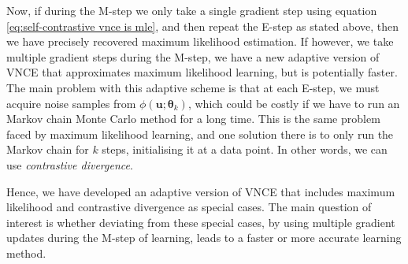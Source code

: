 \documentclass[11pt, oneside]{article}
\newcommand{\thetab}{{\boldsymbol{\theta}}}
\newcommand{\pnn}{\phi}
\renewcommand{\u}{{\mathbf u}}
\theoremstyle{definition}
\begin{document}
{Now, if during the M-step we only take a single gradient step using equation \ref{eq:self-contrastive vnce is mle}, and then repeat the E-step as stated above, then we have precisely recovered maximum likelihood estimation. If however, we take multiple gradient steps during the M-step, we have a new adaptive version of VNCE that approximates maximum likelihood learning, but is potentially faster. The main problem with this adaptive scheme is that at each E-step, we must acquire noise samples from $\pnn(\u; \thetab_k)$, which could be costly if we have to run an Markov chain Monte Carlo method for a long time. This is the same problem faced by maximum likelihood learning, and one solution there is to only run the Markov chain for $k$ steps, initialising it at a data point. In other words, we can use \emph{contrastive divergence}.

Hence, we have developed an adaptive version of VNCE that includes maximum likelihood and contrastive divergence as special cases. The main question of interest is whether deviating from these special cases, by using multiple gradient updates during the M-step of learning, leads to a faster or more accurate learning method.

}
\end{document}
